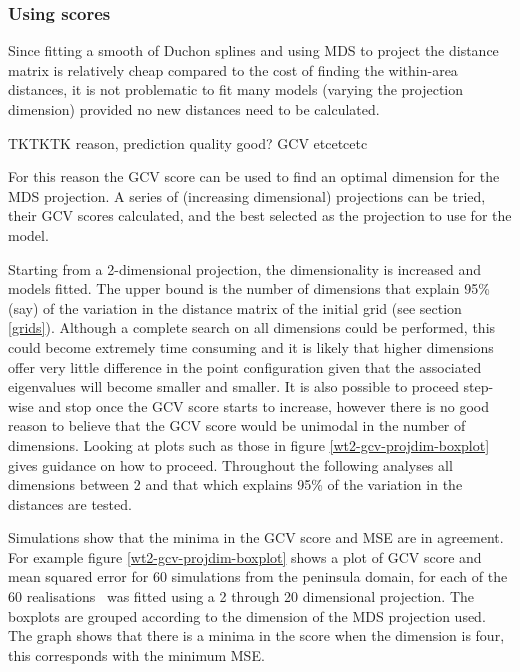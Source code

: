 \subsubsection{Using scores}

Since fitting a smooth of Duchon splines and using MDS to project the distance matrix is relatively cheap compared to the cost of finding the within-area distances, it is not problematic to fit many models (varying the projection dimension) provided no new distances need to be calculated. 

TKTKTK reason, prediction quality good? GCV etcetcetc

For this reason the GCV score can be used to find an optimal dimension for the MDS projection. A series of (increasing dimensional) projections can be tried, their GCV scores calculated, and the best selected as the projection to use for the model.

Starting from a 2-dimensional projection, the dimensionality is increased and models fitted. The upper bound is the number of dimensions that explain 95\% (say) of the variation in the distance matrix of the initial grid (see section \ref{grids}). Although a complete search on all dimensions could be performed, this could become extremely time consuming and it is likely that higher dimensions offer very little difference in the point configuration given that the associated eigenvalues will become smaller and smaller. It is also possible to proceed step-wise and stop once the GCV score starts to increase, however there is no good reason to believe that the GCV score would be unimodal in the number of dimensions. Looking at plots such as those in figure \ref{wt2-gcv-projdim-boxplot} gives guidance on how to proceed. Throughout the following analyses all dimensions between 2 and that which explains 95\% of the variation in the distances are tested.

Simulations show that the minima in the GCV score and MSE are in agreement. For example figure \ref{wt2-gcv-projdim-boxplot} shows a plot of GCV score and mean squared error for 60 simulations from the peninsula domain, for each of the 60 realisations \mdsds\ was fitted using a 2 through 20 dimensional projection. The boxplots are grouped according to the dimension of the MDS projection used. The graph shows that there is a minima in the score when the dimension is four, this corresponds with the minimum MSE.

